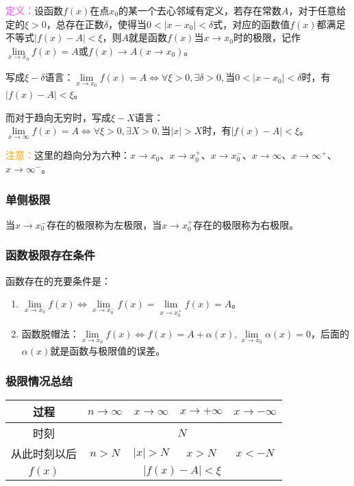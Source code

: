 \documentclass[UTF8, 12pt]{ctexart}
\begin{document}
        \textcolor{violet}{\textbf{定义：}}设函数$f(x)$在点$x_0$的某一个去心邻域有定义，若存在常数$A$，对于任意给定的$\xi>0$，总存在正数$\delta$，使得当$0<\vert x-x_0\vert<\delta$式，对应的函数值$f(x)$都满足不等式$\vert f(x)-A\vert <\xi$，则$A$就是函数$f(x)$当$x\to x_0$时的极限，记作$\lim\limits_{x\to x_0}f(x)=A$或$f(x)\rightarrow A(x\rightarrow x_0)$。

        写成$\xi-\delta$语言：$\lim\limits_{x\to x_0}f(x)=A\Leftrightarrow\forall\xi>0,\exists\delta>0,\text{当}0<\vert x-x_0\vert<\delta$时，有$\vert f(x)-A\vert<\xi$。

        而对于趋向无穷时，写成$\xi-X$语言：$\lim\limits_{x\to\infty}f(x)=A\Leftrightarrow\forall\xi>0,\exists X>0,\text{当}\vert x\vert>X$时，有$\vert f(x)-A\vert<\xi$。

        \textcolor{orange}{注意：}这里的趋向分为六种：$x\to x_0$、$x\to x_0^+$、$x\to x_0^-$、$x\to\infty$、$x\to\infty^+$、$x\to\infty^-$。

        \subsubsection{单侧极限}

        当$x\to x_0^-$存在的极限称为左极限，当$x\to x_0^+$存在的极限称为右极限。

        \subsubsection{函数极限存在条件}

        函数存在的充要条件是：

        \begin{enumerate}
            \item $\lim\limits_{x\to x_0}f(x)\Leftrightarrow\lim\limits_{x\to x_0^-}f(x)=\lim\limits_{x\to x_0^+}f(x)=A$。
            \item 函数脱帽法：$\lim\limits_{x\to x_0}f(x)\Leftrightarrow f(x)=A+\alpha(x),\lim\limits_{x\to x_0}\alpha(x)=0$，后面的$\alpha(x)$就是函数与极限值的误差。
        \end{enumerate}

        \subsubsection{极限情况总结}

        \begin{center}
            \begin{tabular}{|c|c|c|c|c|}
                \hline
                过程 & $n\to\infty$ & $x\to\infty$ & $x\to+\infty$ & $x\to-\infty$ \\ \hline
                时刻 & \multicolumn{4}{c|}{$N$} \\ \hline
                从此时刻以后 & $n>N$ & $\vert x\vert>N$ & $x>N$ & $x<-N$ \\ \hline
                $f(x)$ & \multicolumn{4}{c|}{$\vert f(x)-A\vert<\xi$} \\
                \hline
            \end{tabular}
        \end{center}
\end{document}
